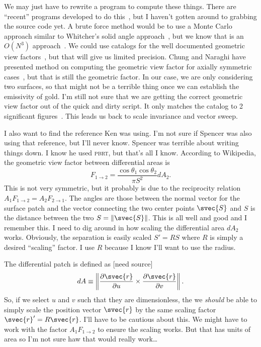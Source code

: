 We may just have to rewrite a program to compute these things.  There
are ``recent'' programs developed to do
this~\cite{walton_calculation_2002}, but I haven't gotten around to
grabbing the source code yet.  A brute force method would be to use a
Monte Carlo approach similar to Whitcher's solid angle
approach~\cite{whitcher_monte_2012}, but we know that is an \(O(N^3)\)
approach~\cite{walton_calculation_2002}.  We could use catalogs for the
well documented geometric view factors~\cite{howell_catalog_2010}, but
that will give us limited precision.  Chung and Naraghi have presented
method on computing the geometric view factor for axially symmetric
cases~\cite{chung_simpler_1982, naraghi_radiation_1982,
chung_formulation_1984}, but that is still the geometric factor.  In our
case, we are only considering two surfaces, so that might not be a
terrible thing once we can establish the emissivity of gold.  I'm still
not sure that we are getting the correct geometric view factor out of
the quick and dirty script.  It only matches the catalog to 2
significant figures~\cite{howell_catalog_2010}.  This leads us back to
scale invariance and vector sweep.

I also want to find the reference Ken was using.  I'm not sure if
Spencer was also using that reference, but I'll never know.  Spencer was
terrible about writing things down.  I know he used \textsc{pbrt}, but
that's all I know.  According to Wikipedia, the geometric view factor
between differential areas is
\begin{equation}
    F_{1\to2} = \frac{\cos\theta_1\cos\theta_2}{\pi S^2} dA_2.
\end{equation}
This is not very symmetric, but it probably is due to the reciprocity
relation \(A_1F_{1\to2} = A_2F_{2\to1}\).  The angles are those between
the normal vector for the surface patch and the vector connecting the
two center points \(\svec{S}\) and \(S\) is the distance between the two
\(S = \lVert\svec{S}\rVert\).  This is all well and good and I remember
this.  I need to dig around in how scaling the differential area
\(dA_2\) works.  Obviously, the separation is easily scaled \(S' = R S\)
where \(R\) is simply a desired ``scaling'' factor.  I use \(R\) because
I know I'll want to use the radius.

The differential patch is defined as [need source]
\begin{equation}
    dA \equiv \left\lVert \frac{\partial\svec{r}}{\partial u} \times
    \frac{\partial\svec{r}}{\partial v} \right \rVert.
\end{equation}
So, if we select \(u\) and \(v\) such that they are dimensionless, the
we \emph{should} be able to simply scale the position vector
\(\svec{r}\) by the same scaling factor \(\svec{r}' = R \svec{r}\).
I'll have to be cautious about this.  We might have to work with the
factor \(A_1F_{1\to2}\) to ensure the scaling works.  But that has units
of area so I'm not sure haw that would really work\ldots

